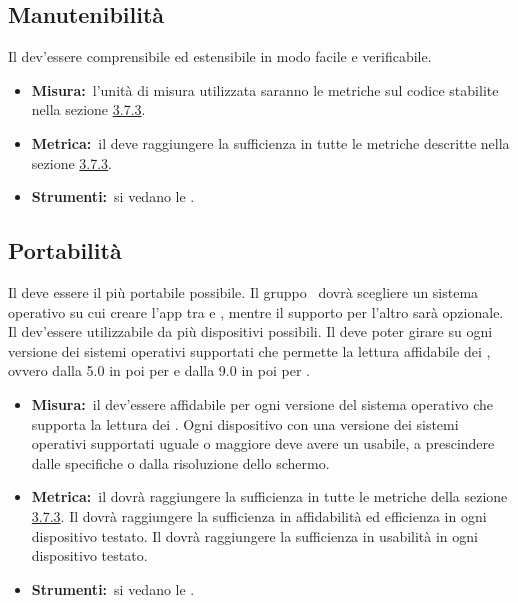 	\subsection{Manutenibilità}
		Il  dev'essere comprensibile ed estensibile in modo facile e verificabile.
		\begin{itemize}
			\item \textbf{Misura:}\ l'unità di misura utilizzata saranno le metriche sul codice stabilite nella sezione \hyperref[sec:3.7.3]{3.7.3}.
			\item \textbf{Metrica:}\ il  deve raggiungere la sufficienza in tutte le metriche descritte nella sezione \hyperref[sec:3.7.3]{3.7.3}.
			\item \textbf{Strumenti:}\ si vedano le \NPdoc.
		\end{itemize}
	\subsection{Portabilità}
		Il  deve essere il più portabile possibile. Il gruppo \AUTORE\ dovrà scegliere un sistema operativo su cui creare l'app tra  e , mentre il supporto per l'altro sarà opzionale. Il  dev'essere utilizzabile da più dispositivi possibili. Il  deve poter girare su ogni versione dei sistemi operativi supportati che permette la lettura affidabile dei , ovvero dalla 5.0 in poi per  e dalla 9.0 in poi per .
		\begin{itemize}
			\item \textbf{Misura:}\ il  dev'essere affidabile per ogni versione del sistema operativo che supporta la lettura dei . Ogni dispositivo con una versione dei sistemi operativi supportati uguale o maggiore deve avere un  usabile, a prescindere dalle specifiche  o dalla risoluzione dello schermo.
			\item \textbf{Metrica:}\ il  dovrà raggiungere la sufficienza in tutte le metriche della sezione \hyperref[sec:3.7.3]{3.7.3}. Il  dovrà raggiungere la sufficienza in affidabilità ed efficienza in ogni dispositivo testato. Il  dovrà raggiungere la sufficienza in usabilità in ogni dispositivo testato.
			\item \textbf{Strumenti:}\ si vedano le \NPdoc.
		\end{itemize}
